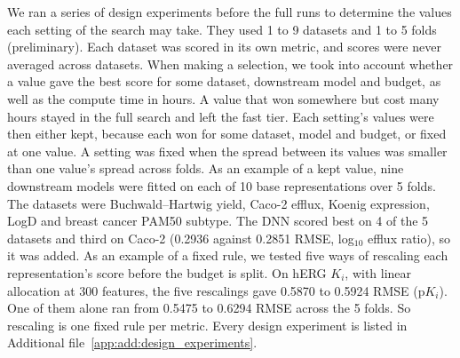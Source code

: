 We ran a series of design experiments before the full runs to determine the values each setting of the search may take. They used 1 to 9 datasets and 1 to 5 folds (preliminary). Each dataset was scored in its own metric, and scores were never averaged across datasets. When making a selection, we took into account whether a value gave the best score for some dataset, downstream model and budget, as well as the compute time in hours. A value that won somewhere but cost many hours stayed in the full search and left the fast tier. Each setting's values were then either kept, because each won for some dataset, model and budget, or fixed at one value. A setting was fixed when the spread between its values was smaller than one value's spread across folds. As an example of a kept value, nine downstream models were fitted on each of 10 base representations over 5 folds. The datasets were Buchwald--Hartwig yield, Caco-2 efflux, Koenig expression, LogD and breast cancer PAM50 subtype. The DNN scored best on 4 of the 5 datasets and third on Caco-2 (0.2936 against 0.2851 RMSE, log$_{10}$ efflux ratio), so it was added. As an example of a fixed rule, we tested five ways of rescaling each representation's score before the budget is split. On hERG $K_i$, with linear allocation at 300 features, the five rescalings gave 0.5870 to 0.5924 RMSE (p$K_i$). One of them alone ran from 0.5475 to 0.6294 RMSE across the 5 folds. So rescaling is one fixed rule per metric. Every design experiment is listed in Additional file~\ref{app:add:design_experiments}.

